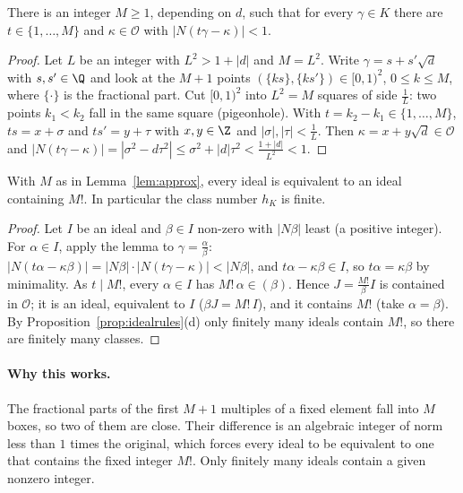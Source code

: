 \begin{lemma}\label{lem:approx}
There is an integer $M\ge1$, depending on $d$, such that for every $\gamma\in K$ there are $t\in\{1,\dots,M\}$ and $\kappa\in\mathcal O$ with $|N(t\gamma-\kappa)|<1$.
\end{lemma}
\begin{proof}
Let $L$ be an integer with $L^2>1+|d|$ and $M=L^2$. Write $\gamma=s+s'\sqrt d$ with $s,s'\in\Q$ and look at the $M+1$ points $(\{ks\},\{ks'\})\in[0,1)^2$, $0\le k\le M$, where $\{\cdot\}$ is the fractional part. Cut $[0,1)^2$ into $L^2=M$ squares of side $\frac1L$: two points $k_1<k_2$ fall in the same square (pigeonhole). With $t=k_2-k_1\in\{1,\dots,M\}$, $ts=x+\sigma$ and $ts'=y+\tau$ with $x,y\in\Z$ and $|\sigma|,|\tau|<\frac1L$. Then $\kappa=x+y\sqrt d\in\mathcal O$ and $|N(t\gamma-\kappa)|=|\sigma^2-d\tau^2|\le\sigma^2+|d|\tau^2<\frac{1+|d|}{L^2}<1$.
\end{proof}

\begin{theorem}\label{thm:classfinite}
With $M$ as in Lemma~\ref{lem:approx}, every ideal is equivalent to an ideal containing $M!$. In particular the class number $h_K$ is finite.
\end{theorem}
\begin{proof}
Let $I$ be an ideal and $\beta\in I$ non-zero with $|N\beta|$ least (a positive integer). For $\alpha\in I$, apply the lemma to $\gamma=\frac\alpha\beta$: $|N(t\alpha-\kappa\beta)|=|N\beta|\cdot|N(t\gamma-\kappa)|<|N\beta|$, and $t\alpha-\kappa\beta\in I$, so $t\alpha=\kappa\beta$ by minimality. As $t\mid M!$, every $\alpha\in I$ has $M!\,\alpha\in(\beta)$. Hence $J=\frac{M!}\beta I$ is contained in $\mathcal O$; it is an ideal, equivalent to $I$ ($\beta J=M!\,I$), and it contains $M!$ (take $\alpha=\beta$). By Proposition~\ref{prop:idealrules}(d) only finitely many ideals contain $M!$, so there are finitely many classes.
\end{proof}

\paragraph{Why this works.}
The fractional parts of the first $M+1$ multiples of a fixed element fall into $M$ boxes, so two of them are close. Their difference is an algebraic integer of norm less than $1$ times the original, which forces every ideal to be equivalent to one that contains the fixed integer $M!$. Only finitely many ideals contain a given nonzero integer.

